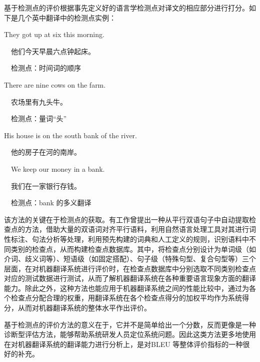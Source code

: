 \parinterval 基于检测点的评价根据事先定义好的语言学检测点对译文的相应部分进行打分。如下是几个英中翻译中的检测点实例：

\begin{example}
They got up at six this morning.

\qquad\ \ 他们今天早晨六点钟起床。

\qquad\ \ 检测点：时间词的顺序
\label{eg:4-3}
\end{example}

\begin{example}
There are nine cows on the farm.

\qquad\ \ 农场里有九头牛。

\qquad\ \ 检测点：量词“头”
\label{eg:4-4}
\end{example}

\begin{example}
His house is on the south bank of the river.

\qquad\ \ 他的房子在河的南岸。

\qquad\ \ We keep our money in a bank.

\qquad\ \ 我们在一家银行存钱。

\qquad\ \ 检测点：bank 的多义翻译
\label{eg:4-5}
\end{example}

\parinterval 该方法的关键在于检测点的获取。有工作曾提出一种从平行双语句子中自动提取检查点的方法，借助大量的双语词对齐平行语料，利用自然语言处理工具对其进行词性标注、句法分析等处理，利用预先构建的词典和人工定义的规则，识别语料中不同类别的检查点，从而构建检查点数据库。其中，将检查点分别设计为单词级（如介词、歧义词等）、短语级（如固定搭配）、句子级（特殊句型、复合句型等）三个层面，在对机器翻译系统进行评价时，在检查点数据库中分别选取不同类别检查点对应的测试数据进行测试，从而了解机器翻译系统在各种重要语言现象方面的翻译能力。除此之外，这种方法也能应用于机器翻译系统之间的性能比较中，通过为各个检查点分配合理的权重，用翻译系统在各个检查点得分的加权平均作为系统得分，从而对机器翻译系统的整体水平作出评价。

\parinterval 基于检测点的评价方法的意义在于，它并不是简单给出一个分数，反而更像是一种诊断型评估方法，能够帮助系统研发人员定位系统问题。因此这类方法更多地使用在对机器翻译系统的翻译能力进行分析上，是对BLEU 等整体评价指标的一种很好的补充。


